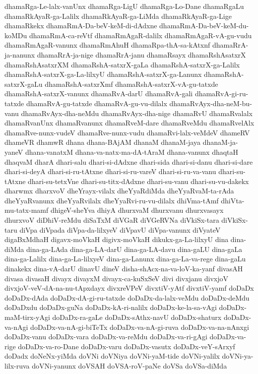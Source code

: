 {dhamaRga-Le-lalx-vanUnx
dhamaRga-LigU
dhamaRga-Lo-Dane
dhamaRgaLu
dhamaRkAyaR-ga-Lalilx
dhamaRkAyaR-ga-LiMda
dhamaRkAyaR-ga-Lige
dhamaRkekx
dhamaRmA-Da-beV-keM-di-dAdxne
dhamaRmA-Da-beV-keM-du-koMDu
dhamaRmA-ca-reVtf
dhamaRmAgaR-dalilx
dhamaRmAgaR-vA-gu-vudu
dhamaRmAgaR-vanunx
dhamaRmAhuH
dhamaRpa-thA-sa-kAtxnf
dhamaRrA-ja-nanunx
dhamaRrA-ja-nige
dhamaRrA-janu
dhamaRsayx
dhamaRshAsatxrX
dhamaRshAsatxrXM
dhamaRshA-satxrX-gaLa
dhamaRshA-satxrX-ga-Lalilx
dhamaRshA-satxrX-ga-La-lilxyU
dhamaRshA-satxrX-ga-Lanunx
dhamaRshA-satxrX-gaLu
dhamaRshA-satxrXmf
dhamaRshA-satxrX-vA-gu-tatxde
dhamaRshA-satxrX-vanunx
dhamaRvA-darU
dhamaRvA-gali
dhamaRvA-gi-ru-tatxde
dhamaRvA-gu-tatxde
dhamaRvA-gu-vu-dilalx
dhamaRvAyx-dha-neM-bu-vanu
dhamaRvAyx-dha-neMdu
dhamaRvAyx-dha-nige
dhamaRvU
dhamaRvalalx
dhamaRvanUnx
dhamaRvanunx
dhamaRveM-dare
dhamaRveMdu
dhamaRvelAlx
dhamaRve-nunx-vudeV
dhamaRve-nunx-vudu
dhamaRvi-lalx-veMdeV
dhameRV
dhameVR
dhamwR
dhana
dhana-BAjAM
dhanaM
dhanaM-jaya
dhanaM-ja-yaneV
dhana-vanatxM
dhana-va-natx-ma-dA-tAraM
dhana-vanunx
dhaqtaH
dhaqvaM
dharA
dhari-salu
dhari-si-dAdxne
dhari-sida
dhari-si-danu
dhari-si-dare
dhari-si-deyA
dhari-si-ru-tAtxne
dhari-si-ru-vareV
dhari-si-ru-va-vanu
dhari-su-tAtxne
dhari-su-tetxVne
dhari-su-titx-dAdxne
dhari-su-vanu
dhari-su-vu-dakekx
dharwmx
dharxvoV
dheYrayx-vilalx
dheYyaRdiMda
dheYyaRvaM-ta-rAda
dheYyaRvanunx
dheYyaRvilalx
dheYyaRvi-ru-vu-dilalx
dhiVma-tAmf
dhiVta-mu-tatx-mamf
dhigeV-sheYva
dhiyA
dhurxvaM
dhurxvanu
dhurxvasayx
dhurxvoV
diDhiV-reMdu
diSaTxM
diVGaR
diVGeRVNa
diVkiSx-tara
diVkiSx-taru
diVpa
diVpada
diVpa-da-lilxyeV
diVpavU
diVpa-vanunx
diVyateV
digaBxMdhaH
digavx-moVkaH
digivx-moVkaH
dikukx-ga-La-lilxyU
dina
dina-diMda
dina-ga-LAda
dina-ga-LA-darU
dina-ga-LA-davu
dina-gaLU
dina-gaLa
dina-ga-Lalilx
dina-ga-La-lilxyeV
dina-ga-Lanunx
dina-ga-La-va-rege
dina-gaLu
dinakekx
dina-vA-darU
dinavU
dineV
disha-shAcx-na-va-loV-ka-yanf
divasAH
divasa
divasaH
divayx
divayxM
divayx-ca-kuSxSeV
divi
divxjanu
divxjoV
divxjoV-veV-dA-na-nu-tApxdayx
divxreVPeV
divxtiV-yAtf
divxtiV-yamf
doDaDx
doDaDx-dAda
doDaDx-dA-gi-ru-tatxde
doDaDx-da-lalx-veMdu
doDaDx-deMdu
doDaDxdu
doDaDx-guNa
doDaDx-kA-ri-nalilx
doDaDx-ke-la-sa-vAgi
doDaDx-maM-tirx-yAgi
doDaDx-ra-gaLe
doDaDx-sAthx-navU
doDaDx-shaturx
doDaDx-va-nAgi
doDaDx-va-nA-gi-biTeTx
doDaDx-va-nA-gi-ruva
doDaDx-va-na-nAnxgi
doDaDx-vanu
doDaDx-vara
doDaDx-va-reMdu
doDaDx-va-ri-gAgi
doDaDx-va-rige
doDaDx-va-ro-Dane
doDaDx-varu
doDaDx-vasutx
doDaDx-veY-sArxyf
doDadx
doNeNx-yiMda
doVNi
doVNiya
doVNi-yaM-tide
doVNi-yalilx
doVNi-ya-lilx-ruva
doVNi-yanunx
doVSAH
doVSA-roV-paNe
doVSa
doVSa-diMda
}
